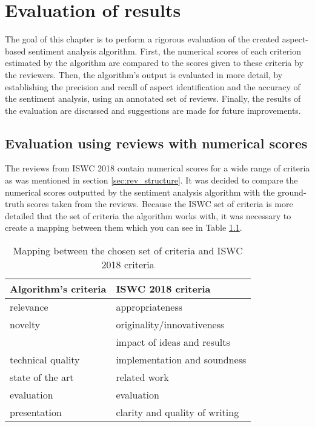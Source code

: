 \chapter{Evaluation of results}
The goal of this chapter is to perform a rigorous evaluation of the created aspect-based sentiment analysis algorithm. First, the numerical scores of each criterion estimated by the algorithm are compared to the scores given to these criteria by the reviewers. Then, the algorithm's output is evaluated in more detail, by establishing the precision and recall of aspect identification and the accuracy of the sentiment analysis, using an annotated set of reviews. Finally, the results of the evaluation are discussed and suggestions are made for future improvements.
\section{Evaluation using reviews with numerical scores}
The reviews from ISWC 2018 contain numerical scores for a wide range of criteria as was mentioned in section \ref{sec:rev_structure}. It was decided to compare the numerical scores outputted by the sentiment analysis algorithm with the ground-truth scores taken from the reviews. Because the ISWC set of criteria is more detailed that the set of criteria the algorithm works with, it was necessary to create a mapping between them which you can see in Table \ref{tab:mapping_numerical}. 

\begin{table}[!htb]
\caption{Mapping between the chosen set of criteria and ISWC 2018 criteria}
\centering
\label{tab:mapping_numerical}
\begin{tabular}{l|l}
\textbf{Algorithm's criteria} & \textbf{ISWC 2018 criteria}    \\ \hline
relevance                     & appropriateness                \\
novelty                       & originality/innovativeness     \\
                              & impact of ideas and results    \\
technical quality             & implementation and soundness   \\
state of the art              & related work                   \\
evaluation                    & evaluation                     \\
presentation                  & clarity and quality of writing
\end{tabular}
\end{table}

